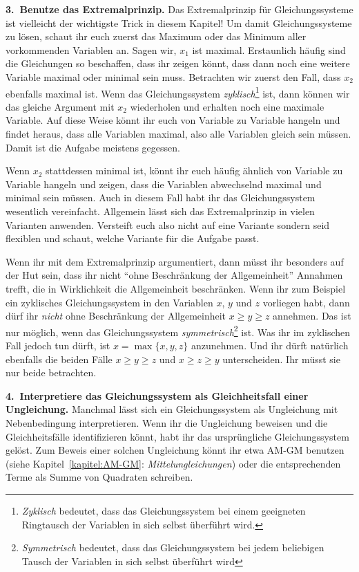 \textbf{3.~Benutze das Extremalprinzip.} Das Extremalprinzip für Gleichungssysteme ist vielleicht der wichtigste Trick in diesem Kapitel! Um damit Gleichungssysteme zu lösen, schaut ihr euch zuerst das Maximum oder das Minimum aller vorkommenden Variablen an. Sagen wir, $x_1$ ist maximal. Erstaunlich häufig sind die Gleichungen so beschaffen, dass ihr zeigen könnt, dass dann noch eine weitere Variable maximal oder minimal sein muss. Betrachten wir zuerst den Fall, dass $x_2$ ebenfalls maximal ist. Wenn das Gleichungssystem \emph{zyklisch}\footnote{\emph{Zyklisch} bedeutet, dass das Gleichungssystem bei einem geeigneten Ringtausch der Variablen in sich selbst überführt wird.} ist, dann können wir das gleiche Argument mit $x_2$ wiederholen und erhalten noch eine maximale Variable. Auf diese Weise könnt ihr euch von Variable zu Variable hangeln und findet heraus, dass alle Variablen maximal, also alle Variablen gleich sein müssen. Damit ist die Aufgabe meistens gegessen.

Wenn $x_2$ stattdessen minimal ist, könnt ihr euch häufig ähnlich von Variable zu Variable hangeln und zeigen, dass die Variablen abwechselnd maximal und minimal sein müssen. Auch in diesem Fall habt ihr das Gleichungssystem wesentlich vereinfacht. Allgemein lässt sich das Extremalprinzip in vielen Varianten anwenden. Versteift euch also nicht auf eine Variante sondern seid flexiblen und schaut, welche Variante für die Aufgabe passt.

Wenn ihr mit dem Extremalprinzip argumentiert, dann müsst ihr besonders auf der Hut sein, dass ihr nicht \enquote{ohne Beschränkung der Allgemeinheit} Annahmen trefft, die in Wirklichkeit die Allgemeinheit beschränken. Wenn ihr zum Beispiel ein zyklisches Gleichungssystem in den Variablen $x$, $y$ und $z$ vorliegen habt, dann dürf ihr \emph{nicht} ohne Beschränkung der Allgemeinheit $x\geqslant y\geqslant z$ annehmen. Das ist nur möglich, wenn das Gleichungssystem \emph{symmetrisch}\footnote{\emph{Symmetrisch} bedeutet, dass das Gleichungssystem bei jedem beliebigen Tausch der Variablen in sich selbst überführt wird} ist. Was ihr im zyklischen Fall jedoch tun dürft, ist $x=\max\{x,y,z\}$ anzunehmen. Und ihr dürft natürlich ebenfalls die beiden Fälle $x\geqslant y\geqslant z$ und $x\geqslant z\geqslant y$ unterscheiden. Ihr müsst sie nur beide betrachten.


\textbf{4.~Interpretiere das Gleichungssystem als Gleichheitsfall einer Ungleichung.} Manchmal lässt sich ein Gleichungssystem als Ungleichung mit Nebenbedingung interpretieren. Wenn ihr die Ungleichung beweisen und die Gleichheitsfälle identifizieren könnt, habt ihr das ursprüngliche Gleichungssystem gelöst. Zum Beweis einer solchen Ungleichung könnt ihr etwa AM-GM benutzen (siehe Kapitel~\ref{kapitel:AM-GM}: \emph{Mittelungleichungen}) oder die entsprechenden Terme als Summe von Quadraten schreiben.

